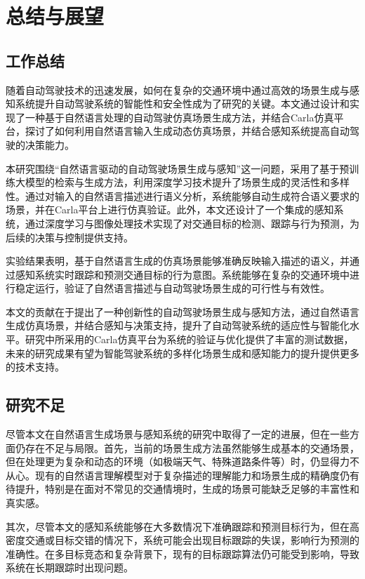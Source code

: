 \chapter{总结与展望}

\section{工作总结}

随着自动驾驶技术的迅速发展，如何在复杂的交通环境中通过高效的场景生成与感知系统提升自动驾驶系统的智能性和安全性成为了研究的关键。本文通过设计和实现了一种基于自然语言处理的自动驾驶仿真场景生成方法，并结合Carla仿真平台，探讨了如何利用自然语言输入生成动态仿真场景，并结合感知系统提高自动驾驶的决策能力。

本研究围绕“自然语言驱动的自动驾驶场景生成与感知”这一问题，采用了基于预训练大模型的检索与生成方法，利用深度学习技术提升了场景生成的灵活性和多样性。通过对输入的自然语言描述进行语义分析，系统能够自动生成符合语义要求的场景，并在Carla平台上进行仿真验证。此外，本文还设计了一个集成的感知系统，通过深度学习与图像处理技术实现了对交通目标的检测、跟踪与行为预测，为后续的决策与控制提供支持。

实验结果表明，基于自然语言生成的仿真场景能够准确反映输入描述的语义，并通过感知系统实时跟踪和预测交通目标的行为意图。系统能够在复杂的交通环境中进行稳定运行，验证了自然语言描述与自动驾驶场景生成的可行性与有效性。

本文的贡献在于提出了一种创新性的自动驾驶场景生成与感知方法，通过自然语言生成仿真场景，并结合感知与决策支持，提升了自动驾驶系统的适应性与智能化水平。研究中所采用的Carla仿真平台为系统的验证与优化提供了丰富的测试数据，未来的研究成果有望为智能驾驶系统的多样化场景生成和感知能力的提升提供更多的技术支持。

\section{研究不足}

尽管本文在自然语言生成场景与感知系统的研究中取得了一定的进展，但在一些方面仍存在不足与局限。首先，当前的场景生成方法虽然能够生成基本的交通场景，但在处理更为复杂和动态的环境（如极端天气、特殊道路条件等）时，仍显得力不从心。现有的自然语言理解模型对于复杂描述的理解能力和场景生成的精确度仍有待提升，特别是在面对不常见的交通情境时，生成的场景可能缺乏足够的丰富性和真实感。

其次，尽管本文的感知系统能够在大多数情况下准确跟踪和预测目标行为，但在高密度交通或目标交错的情况下，系统可能会出现目标跟踪的失误，影响行为预测的准确性。在多目标竞态和复杂背景下，现有的目标跟踪算法仍可能受到影响，导致系统在长期跟踪时出现问题。

